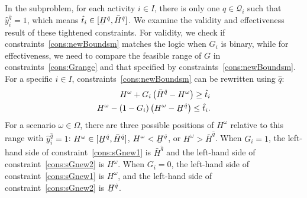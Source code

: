 \documentclass[11pt]{article}
\renewcommand{\underbar}{\underaccent{\bar}}
\begin{document}
	In the subproblem, for each activity \(i \in I\), there is only one \(\hat{q} \in \mathcal{Q}_i\) such that \(\hat{y}_i^{\hat{q}} = 1\), which means \(\hat{t}_i \in 
	[\underbar{H}^{\hat{q}},\bar{H}^{\hat{q}}]\). 
	We examine the validity and effectiveness result of these tightened constraints. For validity, we check if constraints~\eqref{cons:newBoundsm} matches the logic when \(G_i\) is binary, while for effectiveness, we need to compare the feasible range of \(G\) in constraints~\eqref{cons:Grange} and that specified by constraints~\eqref{cons:newBoundsm}. \\
	\newline
	For a specific \(i \in I\), constraints~\eqref{cons:newBoundsm} can be rewritten using \(\hat{q}\):
	\begin{subequations} \label{cons:sGnew}
		\begin{align}
		H^\omega + G_i \left( \bar{H}^{\hat{q}} - H^\omega \right) \geq \hat{t}_i \label{cons:sGnew1}\\
		H^\omega - (1 - G_i) \left(H^\omega - \underbar{H}^{\hat{q}} \right) \leq \hat{t}_i. \label{cons:sGnew2}
		\end{align}
	\end{subequations}
	For a scenario \(\omega \in \Omega\), there are three possible positions of \(H^\omega\) relative to this range with \(\hat{y}_i^{\hat{q}} = 1\): 
	\(H^\omega \in [\underbar{H}^{\hat{q}},\bar{H}^{\hat{q}}]\), \(H^\omega < \underbar{H}^{\hat{q}}\), or \(H^\omega > \bar{H}^{\hat{q}}\). 
	When \(G_i = 1\), the left-hand side of constraint~\eqref{cons:sGnew1} is \(\bar{H}^{\hat{q}}\) and the left-hand side of constraint~\eqref{cons:sGnew2} is \(H^\omega\). When \(G_i = 0\), the left-hand side of constraint~\eqref{cons:sGnew1} is \(H^\omega\), and the left-hand side of constraint~\eqref{cons:sGnew2} is 
	\(\underbar{H}^{\hat{q}}\).
\end{document}
